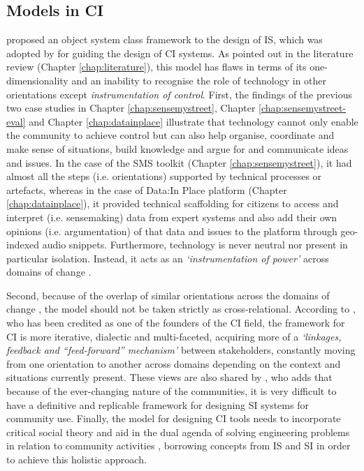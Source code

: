 \subsection{Models in CI}
\citet{hirschheim_exploring_1996} proposed an object system class framework to the design of IS, which was adopted by \citet{stillman_community_2009} for guiding the design of CI systems. As pointed out in the literature review (Chapter \ref{chap:literature}), this model has flaws in terms of its one-dimensionality and an inability to recognise the role of technology in other orientations except \textit{instrumentation of control}. First, the findings of the previous two case studies in Chapter \ref{chap:sensemystreet}, Chapter \ref{chap:sensemystreet-eval} and Chapter \ref{chap:datainplace} illustrate that technology cannot only enable the community to achieve control but can also help organise, coordinate and make sense of situations, build knowledge and argue for and communicate ideas and issues. In the case of the SMS toolkit (Chapter \ref{chap:sensemystreet}), it had almost all the steps (i.e. orientations) \citep{hirschheim_exploring_1996,stillman_community_2009} supported by technical processes or artefacts, whereas in the case of Data:In Place platform (Chapter \ref{chap:datainplace}), it provided technical scaffolding for citizens to access and interpret (i.e. sensemaking) data from expert systems and also add their own opinions (i.e. argumentation) of that data and issues to the platform through geo-indexed audio snippets. Furthermore, technology is never neutral nor present in particular isolation. Instead, it acts as an \textit{`instrumentation of power'} across domains of change \citep[p. 55]{gurstein_toward_2012}.

Second, because of the overlap of similar orientations across the domains of change \citep[also]{stillman_community_2009}, the model should not be taken strictly as cross-relational. According to \citet{gurstein_toward_2012}, who has been credited as one of the founders of the CI field, the framework for CI is more iterative, dialectic and multi-faceted, acquiring more of a \textit{`linkages, feedback and ``feed-forward'' mechanism'} \citep[p. 52]{gurstein_toward_2012} between stakeholders, constantly moving from one orientation to another across domains depending on the context and situations currently present. These views are also shared by \citet{moor_using_2007}, who adds that because of the ever-changing nature of the communities, it is very difficult to have a definitive and replicable framework for designing SI systems for community use. Finally, the model for designing CI tools needs to incorporate critical social theory and aid in the dual agenda of solving engineering problems in relation to community activities \citet{stillman_community_2009}, borrowing concepts from IS and SI \citep{kling_learning_2000,stillman_community_2009} in order to achieve this holistic approach.

